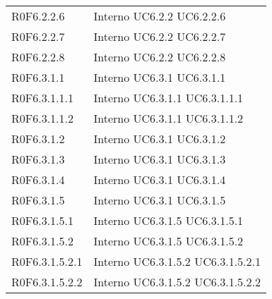 \begin{longtable}{p{2.5cm}!{\VRule[1pt]}p{2.5cm}}
 \\
R0F6.2.2.6 & Interno \newline UC6.2.2
 \newline UC6.2.2.6
 \\
R0F6.2.2.7 & Interno \newline UC6.2.2
 \newline UC6.2.2.7
 \\
R0F6.2.2.8 & Interno \newline UC6.2.2
 \newline UC6.2.2.8
 \\
R0F6.3.1.1 & Interno \newline UC6.3.1
 \newline UC6.3.1.1
 \\
R0F6.3.1.1.1 & Interno \newline UC6.3.1.1
 \newline UC6.3.1.1.1
 \\
R0F6.3.1.1.2 & Interno \newline UC6.3.1.1
 \newline UC6.3.1.1.2
 \\
R0F6.3.1.2 & Interno \newline UC6.3.1
 \newline UC6.3.1.2
 \\
R0F6.3.1.3 & Interno \newline UC6.3.1
 \newline UC6.3.1.3
 \\
R0F6.3.1.4 & Interno \newline UC6.3.1
 \newline UC6.3.1.4
 \\
R0F6.3.1.5 & Interno \newline UC6.3.1
 \newline UC6.3.1.5
 \\
R0F6.3.1.5.1 & Interno \newline UC6.3.1.5
 \newline UC6.3.1.5.1
 \\
R0F6.3.1.5.2 & Interno \newline UC6.3.1.5
 \newline UC6.3.1.5.2
 \\
R0F6.3.1.5.2.1 & Interno \newline UC6.3.1.5.2
 \newline UC6.3.1.5.2.1
 \\
R0F6.3.1.5.2.2 & Interno \newline UC6.3.1.5.2
 \newline UC6.3.1.5.2.2
 \\

\end{longtable}
